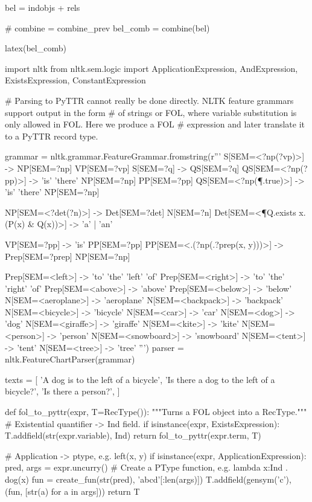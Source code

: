 \begin{cell}
bel = indobjs + rels

# combine = combine_prev
bel_comb = combine(bel)

latex(bel_comb)
\end{cell}

\begin{cell}
import nltk
from nltk.sem.logic import ApplicationExpression, AndExpression, ExistsExpression, ConstantExpression

# Parsing to PyTTR cannot really be done directly. NLTK feature grammars support output in the form
# of strings or FOL, where variable substitution is only allowed in FOL. Here we produce a FOL
# expression and later translate it to a PyTTR record type.

grammar = nltk.grammar.FeatureGrammar.fromstring(r'''
S[SEM=<?np(?vp)>] -> NP[SEM=?np] VP[SEM=?vp]
S[SEM=?q] -> QS[SEM=?q]
QS[SEM=<?np(?pp)>] -> 'is' 'there' NP[SEM=?np] PP[SEM=?pp]
QS[SEM=<?np(\P.true)>] -> 'is' 'there' NP[SEM=?np]

NP[SEM=<?det(?n)>] -> Det[SEM=?det] N[SEM=?n]
Det[SEM=<\P Q.exists x.(P(x) & Q(x))>] -> 'a' | 'an'

VP[SEM=?pp] -> 'is' PP[SEM=?pp]
PP[SEM=<\x.(?np(\y.?prep(x, y)))>] -> Prep[SEM=?prep] NP[SEM=?np]

Prep[SEM=<left>] -> 'to' 'the' 'left' 'of'
Prep[SEM=<right>] -> 'to' 'the' 'right' 'of'
Prep[SEM=<above>] -> 'above'
Prep[SEM=<below>] -> 'below'
N[SEM=<aeroplane>] -> 'aeroplane'
N[SEM=<backpack>] -> 'backpack'
N[SEM=<bicycle>] -> 'bicycle'
N[SEM=<car>] -> 'car'
N[SEM=<dog>] -> 'dog'
N[SEM=<giraffe>] -> 'giraffe'
N[SEM=<kite>] -> 'kite'
N[SEM=<person>] -> 'person'
N[SEM=<snowboard>] -> 'snowboard'
N[SEM=<tent>] -> 'tent'
N[SEM=<tree>] -> 'tree'
''')
parser = nltk.FeatureChartParser(grammar)

texts = [
    'A dog is to the left of a bicycle',
    'Is there a dog to the left of a bicycle?',
    'Is there a person?',
]

def fol_to_pyttr(expr, T=RecType()):
    """Turns a FOL object into a RecType."""
    # Existential quantifier -> Ind field.
    if isinstance(expr, ExistsExpression):
        T.addfield(str(expr.variable), Ind)
        return fol_to_pyttr(expr.term, T)
    
    # Application -> ptype, e.g. left(x, y)
    if isinstance(expr, ApplicationExpression):
        pred, args = expr.uncurry()
        # Create a PType function, e.g. lambda x:Ind . dog(x)
        fun = create_fun(str(pred), 'abcd'[:len(args)])
        T.addfield(gensym('c'), (fun, [str(a) for a in args]))
        return T
    

\end{cell}
